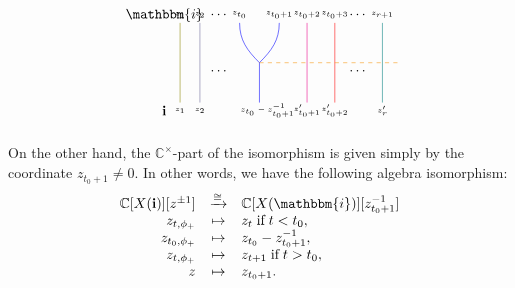 \documentclass[a4paper, 11pt]{amsart}
\newcommand{\word}[1]{\mathbf{#1}}
\newcommand{\wword}[1]{\mathbbm{#1}}
\newcommand{\C}{\mathbb{C}}
\theoremstyle{definition}
\begin{document}
\begin{equation}\label{eq:weave-boldfacebeta-to-beta-1}
    \begin{tikzpicture}
         \node at (-0.4, 2.2) {$\wword{i}$};
         \node at (-0.4, -0.2) {$\word{i}$};
         \draw[color=olive] (0,2) to (0,0);
         \draw[color= CadetBlue] (0.5, 2) to (0.5, 0);
         \node at (1, 0.8) {$\dots$};
         \draw[color=blue] (1.5,2) to[out=270, in=135] (2, 1) to (2, 0);
         \draw[color=blue] (2.5, 2) to[out=270, in=45] (2,1);
         \draw[color=magenta] (3.2,2) to (3.2,0);
         \draw[color=red] (3.9, 2) to (3.9, 0);
         \node at (4.5, 0.8) {$\dots$};
         \draw[color=teal] (5.1, 2) to (5.1, 0);
         \draw[dashed, color=YellowOrange] (2,1) to (5.5,1);
         \node at (0, 2.2) {\tiny{$z_1$}};
         \node at (0, -0.2) {\tiny{$z_1$}};
         \node at (0.5, 2.2) {\tiny{$z_2$}};
         \node at (0.5, -0.2) {\tiny{$z_2$}};
         \node at (1, 2.2) {$\cdots$};
         \node at (1.5, 2.2) {\tiny{$z_{t_0}$}};
         \node at (2.5, 2.2) {\tiny{$z_{t_0+1}$}};
         \node at (2.2, -0.2) {\tiny{$z_{t_0} - z_{t_0+1}^{-1}$}};
         \node at (3.2, 2.2) {\tiny{$z_{t_0+2}$}};
         \node at (3.2, -0.2) {\tiny{$z_{t_0+1}'$}};
         \node at (3.9, 2.2) {\tiny{$z_{t_0+3}$}};
         \node at (3.9, -0.2) {\tiny{$z'_{t_0+2}$}};
         \node at (4.5, 2.2) {$\cdots$};
         \node at (5.1, 2.2) {\tiny{$z_{r+1}$}};
         \node at (5.1, -0.2) {\tiny{$z'_{r}$}};
    \end{tikzpicture}
\end{equation}

On the other hand, the $\C^{\times}$-part of the isomorphism is given simply by the coordinate $z_{t_0+1} \neq 0$. In other words, we have the following algebra isomorphism:
\begin{equation}\label{eq:iso-localizations}
\begin{array}{rcl}
\C[X(\word{i})][z^{\pm 1}] & \xrightarrow{\cong} & \C[X(\wword{i})][z_{t_0+1}^{-1}] \\
z_{t, \phi_{+}} & \mapsto & z_{t} \; \text{if} \; t < t_0, \\
z_{t_0, \phi_{+}} & \mapsto & z_{t_0} - z_{t_0+1}^{-1}, \\
z_{t, \phi_{+}} & \mapsto & z_{t+1} \; \text{if} \; t > t_0, \\
z & \mapsto & z_{t_0+1}.
\end{array}
\end{equation}
\end{document}
